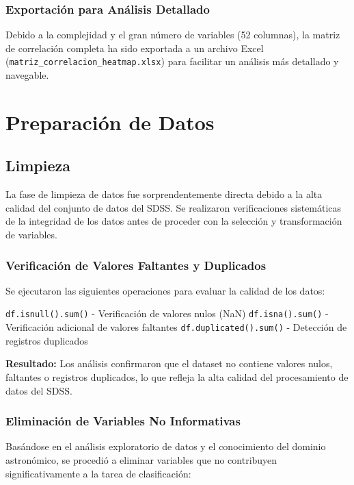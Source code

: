 \documentclass{article}
\begin{document}
\subsubsection{Exportación para Análisis Detallado}

Debido a la complejidad y el gran número de variables (52 columnas), la matriz de correlación completa ha sido exportada a un archivo Excel (\texttt{matriz\_correlacion\_heatmap.xlsx}) para facilitar un análisis más detallado y navegable.


\newpage

\section{Preparación de Datos}

\subsection{Limpieza}

La fase de limpieza de datos fue sorprendentemente directa debido a la alta calidad del conjunto de datos del SDSS. Se realizaron verificaciones sistemáticas de la integridad de los datos antes de proceder con la selección y transformación de variables.

\subsubsection{Verificación de Valores Faltantes y Duplicados}

Se ejecutaron las siguientes operaciones para evaluar la calidad de los datos:

\texttt{df.isnull().sum()} - Verificación de valores nulos (NaN)
\texttt{df.isna().sum()} - Verificación adicional de valores faltantes
\texttt{df.duplicated().sum()} - Detección de registros duplicados

\textbf{Resultado:} Los análisis confirmaron que el dataset no contiene valores nulos, faltantes o registros duplicados, lo que refleja la alta calidad del procesamiento de datos del SDSS.

\subsubsection{Eliminación de Variables No Informativas}

Basándose en el análisis exploratorio de datos y el conocimiento del dominio astronómico, se procedió a eliminar variables que no contribuyen significativamente a la tarea de clasificación:
\end{document}

